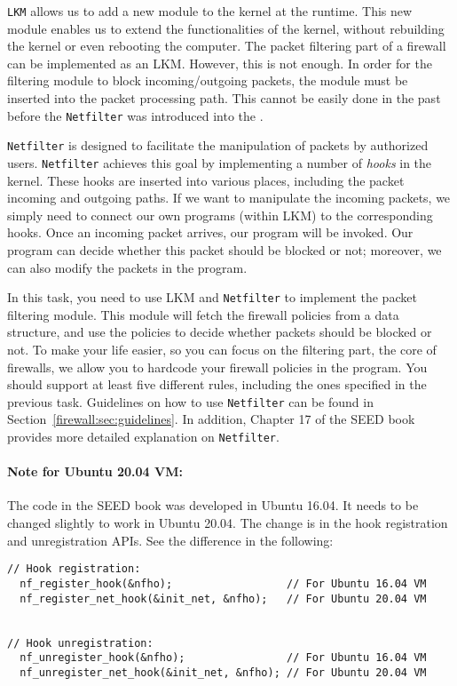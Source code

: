 {\tt LKM} allows us to add a new module to the kernel at the runtime. 
This new module enables us to extend the functionalities of the kernel,
without rebuilding the kernel or even rebooting the computer. 
The packet filtering part of a firewall can be implemented 
as an LKM. However, this is not enough. In order for the filtering module to 
block incoming/outgoing packets, the module 
must be inserted into the packet processing path. 
This cannot be easily done in the past before 
the {\tt Netfilter} was introduced into the \linux.


{\tt Netfilter} is designed to facilitate the manipulation of 
packets by authorized users. {\tt Netfilter} achieves this 
goal by implementing a number of {\em hooks} in the 
\linux kernel. These hooks are inserted into various places, 
including the packet incoming and outgoing paths. 
If we want to manipulate the incoming packets, we simply
need to connect our own programs (within LKM) to the 
corresponding hooks. Once an incoming packet arrives, 
our program will be invoked. Our program can decide 
whether this packet should be blocked or not; moreover,
we can also modify the packets in the program.


In this task, you need to use LKM and {\tt Netfilter} to implement
the packet filtering module.  This module will fetch 
the firewall policies from a data structure, and use the 
policies to decide whether packets should be blocked or not.
To make your life easier, so you can focus on the filtering part, 
the core of firewalls, we allow you to hardcode your firewall policies 
in the program. You should support at least five different 
rules, including the ones specified in the previous task. 
Guidelines on how to use \texttt{Netfilter} can be 
found in Section~\ref{firewall:sec:guidelines}. In addition, 
Chapter 17 of the SEED book provides more detailed explanation on \texttt{Netfilter}. 


\paragraph{Note for Ubuntu 20.04 VM:}
The code in the SEED book was developed in Ubuntu 16.04. It needs to be changed slightly 
to work in Ubuntu 20.04. The change is in the hook registration and 
unregistration APIs. See the difference in the following:


\begin{lstlisting}
// Hook registration:
  nf_register_hook(&nfho);                  // For Ubuntu 16.04 VM
  nf_register_net_hook(&init_net, &nfho);   // For Ubuntu 20.04 VM


// Hook unregistration:
  nf_unregister_hook(&nfho);                // For Ubuntu 16.04 VM
  nf_unregister_net_hook(&init_net, &nfho); // For Ubuntu 20.04 VM
\end{lstlisting}
 


